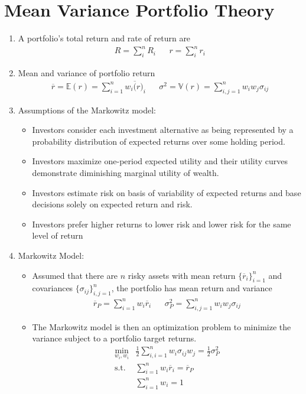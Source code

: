 \documentclass[12pt,twoside]{article}
\begin{document}
\newpage

\section{Mean Variance Portfolio Theory}
\begin{enumerate}
\item A portfolio's total return and rate of return are
	\begin{align*}
		R = \sum_i^n R_i	&&
		r  = \sum_i^n r_i
	\end{align*}

\item Mean and variance of portfolio return
\begin{align*}
	\overline{r} 	= \mathbb{E}(r) = \sum_{i=1}^n w_i \overline(r)_i		&&
	\sigma^2 		= \mathbb{V}(r) = \sum_{i,j=1}^n w_iw_j\sigma_{ij}
\end{align*}

\item Assumptions of the Markowitz model:
\begin{itemize}
	\item Investors consider each investment alternative as being represented by a probability distribution of expected returns over some holding period.
	\item Investors maximize one-period expected utility and their utility curves demonstrate diminishing marginal utility of wealth.
	\item Investors estimate risk on basis of variability of expected returns and base decisions solely on expected return and risk.
	\item Investors prefer higher returns to lower risk and lower risk for the same level of return
\end{itemize}

\item Markowitz Model:
\begin{itemize}
	\item Assumed that there are $n$ risky assets with mean return $\lbrace \overline{r}_i\rbrace_{i=1}^n$ and covariances $\lbrace \sigma_{ij}\rbrace_{i,j=1}^n$, the portfolio has mean return and variance
	\begin{align*}
		\overline{r}_P	= \sum_{i=1}^n w_i \overline{r}_i	&&
		\sigma_P^2		= \sum_{i,j=1}^n w_iw_j\sigma_{ij}
	\end{align*}
	
	\item The Markowitz model is then an optimization problem to minimize the variance subject to a portfolio target returns. 
	\begin{align*}
		\min_{w_i, w_i}	& \frac{1}{2}\sum_{i,i=1}^n w_i\sigma_{ij}w_j = \frac{1}{2}\sigma^2_P\\
		\text{s.t.  	}		& \sum_{i=1}^n w_i\overline{r}_i = \overline{r}_P\\
								&	\sum_{i=1}^n w_i = 1
	\end{align*}
	

\end{itemize}
\end{enumerate}
\end{document}
